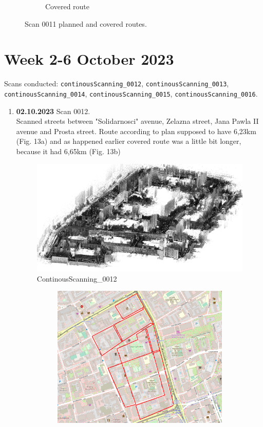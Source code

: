 \documentclass[a4paper,12pt]{book}
\begin{document}
\begin{enumerate}
\begin{figure}[H]
\begin{subfigure}{.88\textwidth}
			\caption{Covered route}
			\label{fig:b11}
		\end{subfigure}
		\caption{Scan 0011 planned and covered routes.}
		\label{fig:fig11}
	\end{figure} 
\end{enumerate}

\section{Week 2-6 October 2023}
Scans conducted: \verb|continousScanning_0012|, \verb|continousScanning_0013|, \verb|continousScanning_0014|, \verb|continousScanning_0015|, \verb|continousScanning_0016|.\\
\begin{enumerate}
	\item \textbf{02.10.2023} Scan 0012. \\
	Scanned streets between "Solidarnosci" avenue, Zelazna street, Jana Pawla II avenue and Prosta street. Route according to plan supposed to have 6,23km (Fig. 13a) and as happened earlier covered route was a little bit longer, because it had 6,65km (Fig. 13b)
	\begin{figure}[H]
		\includegraphics[width=1\linewidth]{cloud12}
		\caption{ContinousScanning\_0012}
	\end{figure}
	\begin{figure}[H]
		\centering
		\begin{subfigure}{.77\textwidth}
			\centering
			\includegraphics[width=1\linewidth]{route_p12}

\end{subfigure}
\end{figure}
\end{enumerate}
\end{document}
